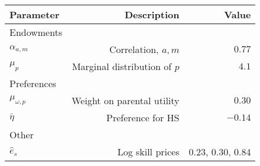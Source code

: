 \begin{tabular}{lrr}
\hline
Parameter & Description  & Value  \\
\hline
Endowments &   &   \\
$\alpha_{a,m}$ & Correlation, $a,m$  & $0.77$  \\
$\mu_{p}$ & Marginal distribution of $p$  & $4.1$  \\
Preferences &   &   \\
$\mu_{\omega,p}$ & Weight on parental utility  & $0.30$  \\
$\bar{\eta}$ & Preference for HS  & $-0.14$  \\
Other &   &   \\
$\hat{e}_{s}$ & Log skill prices  & 0.23, 0.30, 0.84  \\
\hline
\end{tabular}%
